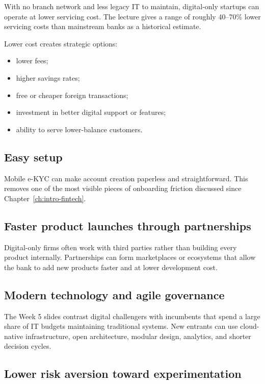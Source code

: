 With no branch network and less legacy IT to maintain, digital-only startups can operate at lower servicing cost. The lecture gives a range of roughly 40--70\% lower servicing costs than mainstream banks as a historical estimate.

Lower cost creates strategic options:

\begin{itemize}
  \item lower fees;
  \item higher savings rates;
  \item free or cheaper foreign transactions;
  \item investment in better digital support or features;
  \item ability to serve lower-balance customers.
\end{itemize}

\subsection{Easy setup}

Mobile e-KYC can make account creation paperless and straightforward. This removes one of the most visible pieces of onboarding friction discussed since Chapter~\ref{ch:intro-fintech}.

\subsection{Faster product launches through partnerships}

Digital-only firms often work with third parties rather than building every product internally. Partnerships can form marketplaces or ecosystems that allow the bank to add new products faster and at lower development cost.

\subsection{Modern technology and agile governance}

The Week 5 slides contrast digital challengers with incumbents that spend a large share of IT budgets maintaining traditional systems. New entrants can use cloud-native infrastructure, open architecture, modular design, analytics, and shorter decision cycles.

\subsection{Lower risk aversion toward experimentation}

